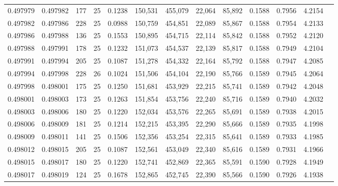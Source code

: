 \begin{tabular}{rrrrrrrrrrrrr}
0.497979 & 0.497982 & 177 &  25 &                                     0.1238 & 150,531 & 455,079 &  22,064 &  85,892 & 0.1588 & 0.7956 & 4.2154 \\
0.497982 & 0.497986 & 228 &  25 &                                     0.0988 & 150,759 & 454,851 &  22,089 &  85,867 & 0.1588 & 0.7954 & 4.2133 \\
0.497986 & 0.497988 & 136 &  25 &                                     0.1553 & 150,895 & 454,715 &  22,114 &  85,842 & 0.1588 & 0.7952 & 4.2120 \\
0.497988 & 0.497991 & 178 &  25 &                                     0.1232 & 151,073 & 454,537 &  22,139 &  85,817 & 0.1588 & 0.7949 & 4.2104 \\
0.497991 & 0.497994 & 205 &  25 &                                     0.1087 & 151,278 & 454,332 &  22,164 &  85,792 & 0.1588 & 0.7947 & 4.2085 \\
0.497994 & 0.497998 & 228 &  26 &                                     0.1024 & 151,506 & 454,104 &  22,190 &  85,766 & 0.1589 & 0.7945 & 4.2064 \\
0.497998 & 0.498001 & 175 &  25 &                                     0.1250 & 151,681 & 453,929 &  22,215 &  85,741 & 0.1589 & 0.7942 & 4.2048 \\
0.498001 & 0.498003 & 173 &  25 &                                     0.1263 & 151,854 & 453,756 &  22,240 &  85,716 & 0.1589 & 0.7940 & 4.2032 \\
0.498003 & 0.498006 & 180 &  25 &                                     0.1220 & 152,034 & 453,576 &  22,265 &  85,691 & 0.1589 & 0.7938 & 4.2015 \\
0.498006 & 0.498009 & 181 &  25 &                                     0.1214 & 152,215 & 453,395 &  22,290 &  85,666 & 0.1589 & 0.7935 & 4.1998 \\
0.498009 & 0.498011 & 141 &  25 &                                     0.1506 & 152,356 & 453,254 &  22,315 &  85,641 & 0.1589 & 0.7933 & 4.1985 \\
0.498012 & 0.498015 & 205 &  25 &                                     0.1087 & 152,561 & 453,049 &  22,340 &  85,616 & 0.1589 & 0.7931 & 4.1966 \\
0.498015 & 0.498017 & 180 &  25 &                                     0.1220 & 152,741 & 452,869 &  22,365 &  85,591 & 0.1590 & 0.7928 & 4.1949 \\
0.498017 & 0.498019 & 124 &  25 &                                     0.1678 & 152,865 & 452,745 &  22,390 &  85,566 & 0.1590 & 0.7926 & 4.1938 \\

\end{tabular}

